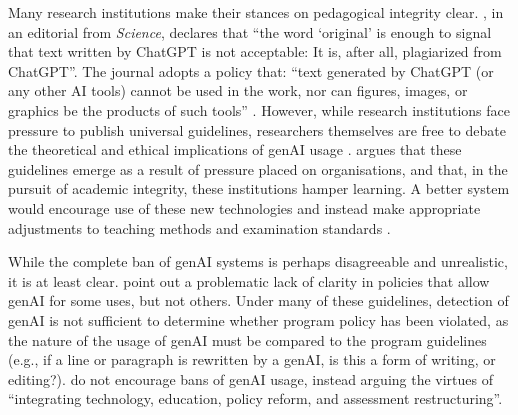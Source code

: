 Many research institutions make their stances on pedagogical integrity clear. \textcite{h_holden_thorp_chatgpt_2023}, in an editorial from \emph{Science}, declares that ``the word `original' is enough to signal that text written by ChatGPT is not acceptable: It is, after all, plagiarized from ChatGPT''. The journal adopts a policy that: ``text generated by ChatGPT (or any other AI tools) cannot be used in the work, nor can figures, images, or graphics be the products of such tools'' \cite{h_holden_thorp_chatgpt_2023}. However, while research institutions face pressure to publish universal guidelines, researchers themselves are free to debate the theoretical and ethical implications of genAI usage \cite{lav_r_varshney_limits_2020,h_holden_thorp_chatgpt_2023,yu_huang_reflection_2023,weber-wulff_testing_2023,otterbacher_why_2023}. \textcite{yu_huang_reflection_2023} argues that these guidelines emerge as a result of pressure placed on organisations, and that, in the pursuit of academic integrity, these institutions hamper learning. A better system would encourage use of these new technologies and instead make appropriate adjustments to teaching methods and examination standards 
\cite{yu_huang_reflection_2023}. 

While the complete ban of genAI systems is perhaps disagreeable and unrealistic, it is at least clear. \textcite{mike_perkins_decoding_2023} point out a problematic lack of clarity in policies that allow genAI for some uses, but not others. Under many of these guidelines, detection of genAI is not sufficient to determine whether program policy has been violated, as the nature of the usage of genAI must be compared to the program guidelines (e.g., if a line or paragraph is rewritten by a genAI, is this a form of writing, or editing?). \textcite{mike_perkins_decoding_2023} do not encourage bans of genAI usage, instead arguing the virtues of ``integrating technology, education, policy reform, and assessment restructuring''.

